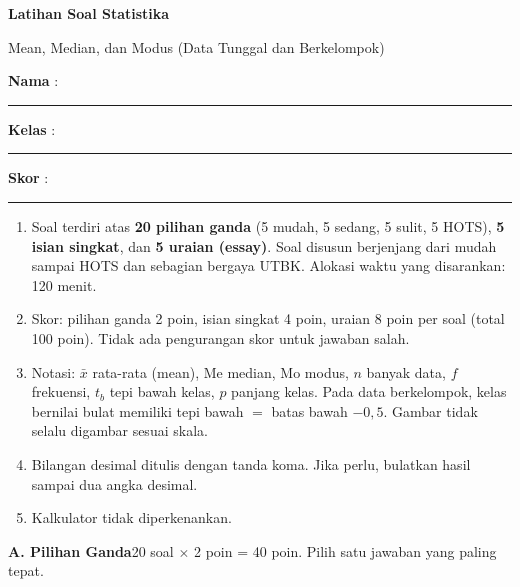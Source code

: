 \documentclass[a4paper,11pt]{article}
\newcommand{\Me}{\mathrm{Me}}
\newcommand{\Mo}{\mathrm{Mo}}
\newcounter{no}
\newcommand{\bagian}[2]{\par\Needspace{6\baselineskip}\vspace{1.0em}\noindent
  \begin{tcolorbox}[colback=navy,colframe=navy,coltext=white,boxrule=0pt,arc=2pt,left=6pt,right=6pt,top=3pt,bottom=3pt]
  \textbf{#1}\hfill{\small #2}\end{tcolorbox}\setcounter{no}{0}\par\vspace{-0.3em}}
\begin{document}
\thispagestyle{fancy}

\begin{center}
  {\color{navy}\fontsize{22}{26}\selectfont\bfseries Latihan Soal Statistika\par}
  \vspace{2pt}
  {\color{teal}\large Mean, Median, dan Modus (Data Tunggal dan Berkelompok)\par}
\end{center}
\vspace{2pt}
\begin{tcolorbox}[colback=softbg,colframe=navy!40,boxrule=0.6pt,arc=3pt,left=8pt,right=8pt,top=5pt,bottom=5pt]
\noindent\textbf{Nama} : \rule{4.6cm}{0.4pt}\hfill\textbf{Kelas} : \rule{2.2cm}{0.4pt}\hfill\textbf{Skor} : \rule{2.2cm}{0.4pt}
\end{tcolorbox}
\vspace{2pt}
\begin{tcolorbox}[colback=white,colframe=teal,boxrule=0.8pt,arc=3pt,left=8pt,right=8pt,top=4pt,bottom=4pt,title={\bfseries Petunjuk Pengerjaan},coltitle=white,fonttitle=\small]
\small
\begin{enumerate}[leftmargin=1.4em,itemsep=1pt,topsep=1pt]
\item Soal terdiri atas \textbf{20 pilihan ganda} (5 mudah, 5 sedang, 5 sulit, 5 HOTS), \textbf{5 isian singkat}, dan \textbf{5 uraian (essay)}. Soal disusun berjenjang dari mudah sampai HOTS dan sebagian bergaya UTBK. Alokasi waktu yang disarankan: 120 menit.
\item Skor: pilihan ganda 2 poin, isian singkat 4 poin, uraian 8 poin per soal (total 100 poin). Tidak ada pengurangan skor untuk jawaban salah.
\item Notasi: $\bar{x}$ rata-rata (mean), $\Me$ median, $\Mo$ modus, $n$ banyak data, $f$ frekuensi, $t_b$ tepi bawah kelas, $p$ panjang kelas. Pada data berkelompok, kelas bernilai bulat memiliki tepi bawah $=$ batas bawah $-0{,}5$. Gambar tidak selalu digambar sesuai skala.
\item Bilangan desimal ditulis dengan tanda koma. Jika perlu, bulatkan hasil sampai dua angka desimal.
\item Kalkulator tidak diperkenankan.
\end{enumerate}
\end{tcolorbox}

\bagian{A. Pilihan Ganda}{20 soal $\times$ 2 poin = 40 poin. Pilih satu jawaban yang paling tepat.}
\end{document}
